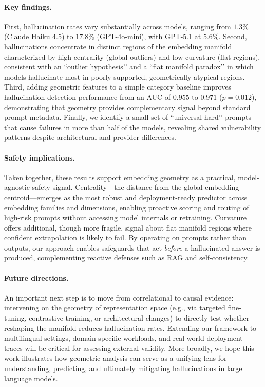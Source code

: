 \documentclass{article}
\begin{document}
\paragraph{Key findings.} First, hallucination rates vary substantially across models, ranging from \(1.3\%\) (Claude Haiku 4.5) to \(17.8\%\) (GPT-4o-mini), with GPT-5.1 at \(5.6\%\). Second, hallucinations concentrate in distinct regions of the embedding manifold characterized by high centrality (global outliers) and low curvature (flat regions), consistent with an ``outlier hypothesis’’ and a ``flat manifold paradox’’ in which models hallucinate most in poorly supported, geometrically atypical regions. Third, adding geometric features to a simple category baseline improves hallucination detection performance from an AUC of \(0.955\) to \(0.971\) (\(p = 0.012\)), demonstrating that geometry provides complementary signal beyond standard prompt metadata. Finally, we identify a small set of ``universal hard’’ prompts that cause failures in more than half of the models, revealing shared vulnerability patterns despite architectural and provider differences.

\paragraph{Safety implications.} Taken together, these results support embedding geometry as a practical, model-agnostic safety signal. Centrality---the distance from the global embedding centroid---emerges as the most robust and deployment-ready predictor across embedding families and dimensions, enabling proactive scoring and routing of high-risk prompts without accessing model internals or retraining. Curvature offers additional, though more fragile, signal about flat manifold regions where confident extrapolation is likely to fail. By operating on prompts rather than outputs, our approach enables safeguards that act \emph{before} a hallucinated answer is produced, complementing reactive defenses such as RAG and self-consistency.

\paragraph{Future directions.} An important next step is to move from correlational to causal evidence: intervening on the geometry of representation space (e.g., via targeted fine-tuning, contrastive training, or architectural changes) to directly test whether reshaping the manifold reduces hallucination rates. Extending our framework to multilingual settings, domain-specific workloads, and real-world deployment traces will be critical for assessing external validity. More broadly, we hope this work illustrates how geometric analysis can serve as a unifying lens for understanding, predicting, and ultimately mitigating hallucinations in large language models.
\end{document}
